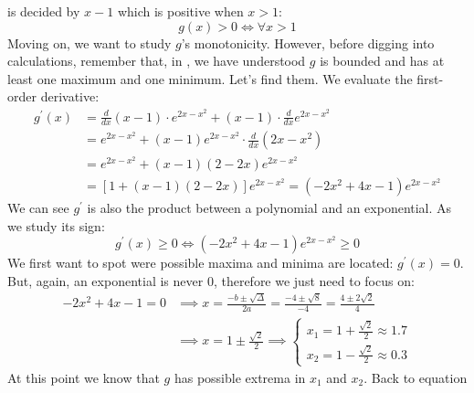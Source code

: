 is decided by $x-1$ which is positive when $x > 1$:
\begin{equation*}
    g(x) > 0 \iff \forall x > 1
\end{equation*}
Moving on, we want to study $g$'s monotonicity. However, before digging
into calculations, remember that, in , we have understood
$g$ is bounded and has at least one maximum and one minimum. Let's find them. 
We evaluate the first-order derivative:
\begin{equation}\label{eq:gprimedef}
    \begin{split}
        g^\prime(x) &= \frac{d}{dx} (x - 1) \cdot e^{2x - x^2} + (x - 1) \cdot \frac{d}{dx} e^{2x - x^2}\\
            &= e^{2x - x^2} + (x - 1)  e^{2x - x^2} \cdot \frac{d}{dx} (2x - x^2)\\
            &= e^{2x - x^2} + (x - 1) (2 - 2x) e^{2x - x^2}\\
            &= \left[ 1 + (x - 1) (2 - 2x) \right] e^{2x - x^2} = (-2x^2 + 4x - 1) e^{2x - x^2}
    \end{split}
\end{equation}
We can see $g^\prime$ is also the product between a polynomial and an exponential.
As we study its sign:
\begin{equation}\label{eq:gprimegeqzero}
    g^\prime(x) \geq 0 \iff (-2x^2 + 4x - 1) e^{2x - x^2} \geq 0
\end{equation}
We first want to spot were possible maxima and minima are located: $g^\prime(x) = 0$.
But, again, an exponential is never $0$, therefore we just need to focus
on:
\begin{equation}\label{eq:grpimenull}
    \begin{split}
        -2x^2 + 4x - 1 = 0 &\implies x = \frac{-b \pm \sqrt{\Delta}}{2a} =
        \frac{-4 \pm \sqrt{8}}{-4} = \frac{4 \pm 2\sqrt{2}}{4}\\
        &\implies
        x = 1 \pm \frac{\sqrt{2}}{2} \implies
        \begin{cases}
            x_1 = 1 + \frac{\sqrt{2}}{2} \approx 1.7\\
            x_2 = 1 - \frac{\sqrt{2}}{2} \approx 0.3
        \end{cases}
    \end{split}
\end{equation}
At this point we know that $g$ has possible extrema in $x_1$ and $x_2$. Back to equation
